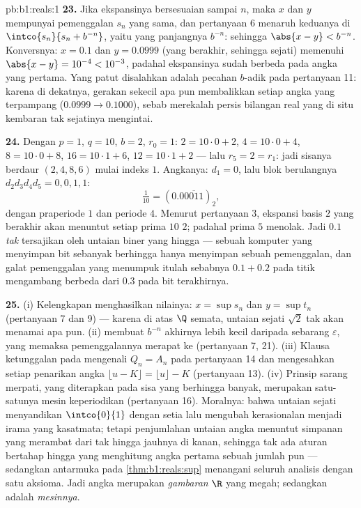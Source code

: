 \begin{solution}{pb:b1:reals:1}
\textbf{23.} Jika ekspansinya bersesuaian sampai $n$, maka $x$ dan $y$
mempunyai pemenggalan $s_n$ yang sama, dan pertanyaan 6 menaruh keduanya di
$\intco{s_n}{s_n + b^{-n}}$, yaitu  yang panjangnya $b^{-n}$:
sehingga $\abs{x - y} < b^{-n}$. Konversnya: $x = 0.1$ dan $y = 0.0999$
(yang berakhir, sehingga sejati) memenuhi $\abs{x - y} = 10^{-4} <
10^{-3}$, padahal ekspansinya sudah berbeda pada angka yang pertama.
Yang patut disalahkan adalah pecahan $b$-adik pada pertanyaan 11: karena di dekatnya,
gerakan sekecil apa pun membalikkan setiap angka yang terpampang ($0.0999 \to
0.1000$), sebab merekalah persis bilangan real yang di situ
kembaran tak sejatinya mengintai.

\textbf{24.} Dengan $p = 1$, $q = 10$, $b = 2$, $r_0 = 1$: $2 = 10 \cdot
0 + 2$, $4 = 10 \cdot 0 + 4$, $8 = 10 \cdot 0 + 8$, $16 = 10
\cdot 1 + 6$, $12 = 10 \cdot 1 + 2$ --- lalu $r_5 = 2 = r_1$: jadi
sisanya berdaur $(2, 4, 8, 6)$ mulai indeks $1$. Angkanya: $d_1 =
0$, lalu blok berulangnya $d_2 d_3 d_4 d_5 = 0, 0, 1, 1$:
\[
\tfrac{1}{10} = (0.0\overline{0011})_2 ,
\]
dengan praperiode $1$ dan periode $4$. Menurut pertanyaan 3, ekspansi basis $2$
yang berakhir akan menuntut setiap prima $10$  $2$; padahal prima
$5$ menolak. Jadi $0.1$ \emph{tak} tersajikan oleh untaian
biner yang hingga --- sebuah komputer yang menyimpan bit sebanyak berhingga hanya menyimpan
sebuah pemenggalan, dan galat pemenggalan yang menumpuk itulah sebabnya
$0.1 + 0.2$ pada titik mengambang berbeda dari $0.3$ pada bit terakhirnya.

\textbf{25.} (i) Kelengkapan menghasilkan nilainya: $x = \sup s_n$
dan $y = \sup t_n$ (pertanyaan 7 dan 9) --- karena di atas $\Q$ semata,
untaian sejati $\sqrt 2$ tak akan menamai apa pun. (ii)  membuat $b^{-n}$ akhirnya lebih kecil daripada sebarang
$\varepsilon$, yang memaksa pemenggalannya merapat ke
 (pertanyaan 7, 21). (iii) Klausa ketunggalan pada
 mengenali $Q_n = A_n$ pada pertanyaan 14 dan mengesahkan setiap
penarikan angka $\lfloor u - K \rfloor = \lfloor u \rfloor - K$
(pertanyaan 13). (iv) Prinsip sarang merpati, yang diterapkan pada sisa
yang berhingga banyak, merupakan satu-satunya mesin keperiodikan (pertanyaan 16).
Moralnya: bahwa untaian sejati menyandikan $\intco{0}{1}$ dengan setia lalu mengubah
kerasionalan menjadi irama yang kasatmata; tetapi penjumlahan untaian angka
menuntut simpanan yang merambat dari tak hingga jauhnya di kanan, sehingga tak ada
aturan bertahap hingga yang menghitung angka pertama sebuah jumlah pun ---
sedangkan antarmuka  pada \cref{thm:b1:reals:sup} menangani
seluruh analisis dengan satu aksioma. Jadi angka merupakan \emph{gambaran}
$\R$ yang megah; sedangkan  adalah \emph{mesinnya}.

\end{solution}
